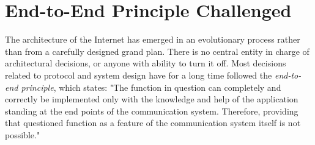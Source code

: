 




%



\section{End-to-End Principle Challenged}

The architecture of the Internet has emerged in an evolutionary process rather than from a carefully designed grand plan. There is no central entity in charge of architectural decisions, or anyone with ability to turn it off. Most decisions related to protocol and system design have for a long time followed the \textit{end-to-end principle}, which states: "The function in question can completely and correctly be implemented only with the knowledge and help of the application standing at the end points of the communication system. Therefore, providing that questioned function as a feature of the communication system itself is not possible." \cite{endtoend}

